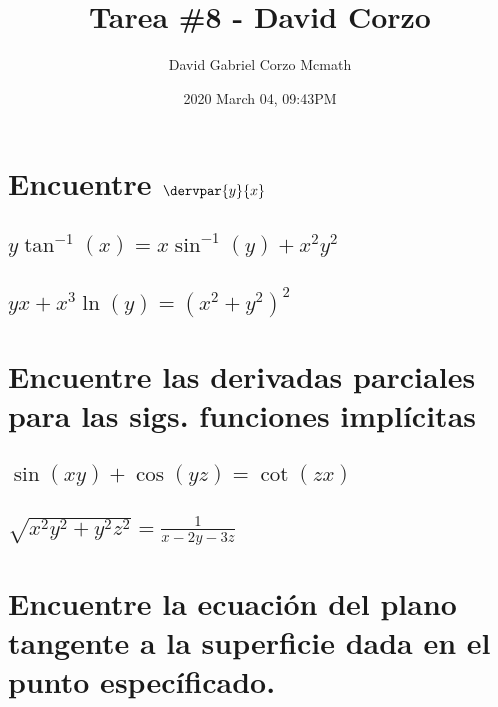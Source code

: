 \documentclass{article}
\title{Tarea \#8 - David Corzo}
\date{2020 March 04, 09:43PM}
\author{David Gabriel Corzo Mcmath}
\begin{document}
\maketitle

\section{Encuentre $\dervpar{y}{x}$}
\subsection{$\displaystyle y\tan^{-1}(x)=x\sin^{-1}(y)+x^2y^2$}  

\subsection{$\displaystyle yx+x^3\ln(y)=\left(x^2+y^2\right)^2$}


\section{Encuentre las derivadas parciales para las sigs. funciones implícitas}

\subsection{$\displaystyle \sin(xy)+\cos(yz)=\cot(zx)$}

\subsection{$\displaystyle \sqrt{x^2y^2+y^2z^2}=\frac{1}{x-2y-3z} $}




\section{Encuentre la ecuación del plano tangente a la superficie dada en el punto específicado.}
\end{document}

